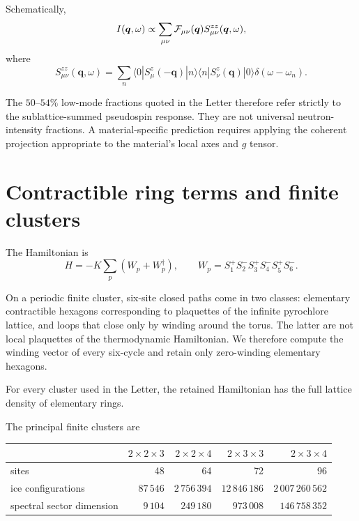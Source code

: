 \documentclass[
aps,
prl,
onecolumn,
amsmath,
amssymb,
superscriptaddress,
longbibliography
]{revtex4-2}
\newcommand{\bq}{\bm q}
\begin{document}
Schematically,
\begin{equation}
I(\bq,\omega)
\propto
\sum_{\mu\nu}
{\cal F}_{\mu\nu}(\bq)
S_{\mu\nu}^{zz}(\bq,\omega),
\end{equation}
where
\begin{equation}
S_{\mu\nu}^{zz}(\bq,\omega)
=
\sum_n
\langle0|
S_\mu^z(-\bq)
|n\rangle
\langle n|
S_\nu^z(\bq)
|0\rangle
\delta(\omega-\omega_n).
\end{equation}

The $50$--$54\%$ low-mode fractions quoted in the Letter therefore
refer strictly to the sublattice-summed pseudospin response.
They are not universal neutron-intensity fractions.
A material-specific prediction requires applying the coherent
projection appropriate to the material's local axes and $g$ tensor.

\section{Contractible ring terms and finite clusters}
\label{sec:clusters}

The Hamiltonian is
\begin{equation}
H
=
-K\sum_p
\left(
W_p+W_p^\dagger
\right),
\qquad
W_p
=
S_1^+S_2^-S_3^+S_4^-S_5^+S_6^- .
\label{eq:ring_supp}
\end{equation}

On a periodic finite cluster, six-site closed paths come in two
classes:
elementary contractible hexagons corresponding to plaquettes of the
infinite pyrochlore lattice, and loops that close only by winding
around the torus.
The latter are not local plaquettes of the thermodynamic Hamiltonian.
We therefore compute the winding vector of every six-cycle and retain
only zero-winding elementary hexagons.

For every cluster used in the Letter, the retained Hamiltonian has the
full lattice density of elementary rings.

The principal finite clusters are
\begin{center}
\begin{tabular}{lrrrr}
\hline\hline
&
$2\times2\times3$
&
$2\times2\times4$
&
$2\times3\times3$
&
$2\times3\times4$
\\
\hline
sites
&
48&64&72&96
\\
ice configurations
&
$87\,546$
&
$2\,756\,394$
&
$12\,846\,186$
&
$2\,007\,260\,562$
\\
spectral sector dimension
&
$9\,104$
&
$249\,180$
&
$973\,008$
&
$146\,758\,352$
\\
\hline\hline
\end{tabular}
\end{center}
\end{document}
